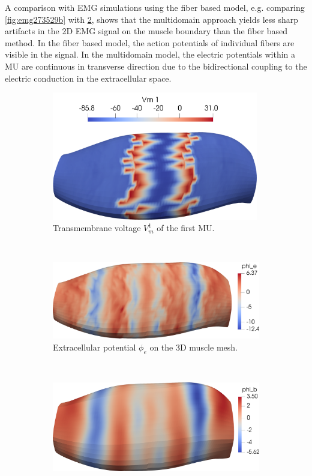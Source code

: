 A comparison with EMG simulations using the fiber based model, e.g. comparing \cref{fig:emg273529b} with \cref{fig:multidomain_25mus2_emg}, shows that the multidomain approach yields less sharp artifacts in the 2D EMG signal on the muscle boundary than the fiber based method. In the fiber based model, the action potentials of individual fibers are visible in the signal. In the multidomain model, the electric potentials within a MU are continuous in transverse direction due to the bidirectional coupling to the electric conduction in the extracellular space.

\begin{figure}
  \centering%
  \begin{subfigure}[t]{\textwidth}%
    \centering%
    \includegraphics[width=9cm]{images/results/application/multidomain_25mus_snapshot.png}%
    \caption{Transmembrane voltage $V_m^1$ of the first MU.}%
    \label{fig:multidomain_25mus_snapshot}%
  \end{subfigure} \\[4mm]
  \begin{subfigure}[t]{\textwidth}%
    \centering%
    \includegraphics[width=10cm]{images/results/application/multidomain_25mus2_emg.png}%
    \caption{Extracellular potential $\phi_e$ on the 3D muscle mesh.}%
    \label{fig:multidomain_25mus2_emg}%
  \end{subfigure} \\[4mm]
  \begin{subfigure}[t]{\textwidth}%
    \centering%
    \includegraphics[width=10cm]{images/results/application/multidomain_25mus2_body.png}%

\end{subfigure}
\end{figure}
